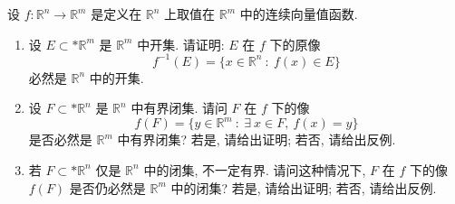 \begin{question}[points = 10]
设 $f: \mathbb{R}^n \rightarrow \mathbb{R}^m$ 是定义在 $\mathbb{R}^n$ 上取值在 $\mathbb{R}^m$ 中的连续向量值函数.
\begin{enumerate}
\item 设 $E \subset* \mathbb{R}^m$ 是 $\mathbb{R}^m$ 中开集. 请证明: $E$ 在 $f$ 下的原像
\[f^{-1}(E) = \{ x \in \mathbb{R}^n ~ : ~ f(x) \in E \}\]
必然是 $\mathbb{R}^n$ 中的开集.
\item 设 $F \subset* \mathbb{R}^n$ 是 $\mathbb{R}^n$ 中有界闭集. 请问 $F$ 在 $f$ 下的像
\[f(F) = \{ y \in \mathbb{R}^m ~ : ~ \exists ~ x \in F, ~ f(x) = y \}\]
是否必然是 $\mathbb{R}^m$ 中有界闭集? 若是, 请给出证明; 若否, 请给出反例.
\item 若 $F \subset* \mathbb{R}^n$ 仅是 $\mathbb{R}^n$ 中的闭集, 不一定有界. 请问这种情况下, $F$ 在 $f$ 下的像 $f(F)$ 是否仍必然是 $\mathbb{R}^m$ 中的闭集? 若是, 请给出证明; 若否, 请给出反例.
\end{enumerate}

\end{question}

